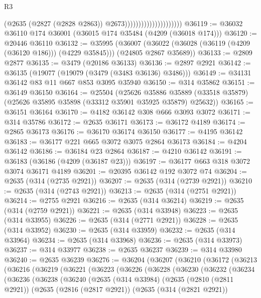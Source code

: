 \begin{lexlean}{R3}
\begin{coremodule}
                                            (@2635 (@2827 (@2828 @2863)) @2673)))))))))))))))))))))
@36119 := @36032 @36110 @174 @36001 (@36015 @174 @35484 (@4209 (@36018 @174)))
@36120 := @20446 @36110
@36132 := @35995
    (@36007 (@36022 (@36028 (@36119 (@4209 (@36120 @186))) (@4229 @35845))) (@24805 @2867 @35689))
@36133 := @2809 @2877
@36135 := @3479 (@20186 @36133)
@36136 := @2897 @2921
@36142 := @36135 (@19077 (@19079 (@3479 (@3483 @36136) @3486)))
@36149 := @34131 @36142 @83 @11 @667 @853 @3095 @35940
@36150 := @314 @35862
@36151 := @36149 @36150
@36164 := @25504
    (@25626
      @35886
      @35889
      (@33518 @35879)
      (@25626 @35895 @35898 (@33312 @35901 @35925 @35879) @25632))
@36165 := @36151 @36164
@36170 := @4182 @36142 @308 @666 @3093 @3072
@36171 := @314 @35786
@36172 := @2635 @36171
@36173 := @36172 @4189
@36174 := @2865 @36173
@36176 := @36170 @36174 @36150
@36177 := @4195 @36142
@36183 := @36177 @221 @665 @3072 @3075 @2864 @36173
@36184 := @4204 @36142
@36186 := @36184 @23 @2864
@36187 := @4210 @36142
@36191 := @36183 (@36186 (@4209 (@36187 @23)))
@36197 := @36177 @663 @318 @3072 @3074 @36171 @4189
@36201 := @20395 @36142 @192 @3072 @74
@36204 := @2635 (@314 (@2735 @2921))
@36207 := @2635 (@314 (@2739 @2921))
@36210 := @2635 (@314 (@2743 @2921))
@36213 := @2635 (@314 (@2751 @2921))
@36214 := @2755 @2921
@36216 := @2635 (@314 @36214)
@36219 := @2635 (@314 (@2759 @2921))
@36221 := @2635 (@314 @33948)
@36223 := @2635 (@314 @33955)
@36226 := @2635 (@314 (@2771 @2921))
@36228 := @2635 (@314 @33952)
@36230 := @2635 (@314 @33959)
@36232 := @2635 (@314 @33964)
@36234 := @2635 (@314 @33968)
@36236 := @2635 (@314 @33973)
@36237 := @314 @33977
@36238 := @2635 @36237
@36239 := @314 @33980
@36240 := @2635 @36239
@36276 := @36204
    (@36207
      (@36210
        (@36172
          (@36213
            (@36216
              (@36219
                (@36221
                  (@36223
                    (@36226
                      (@36228
                        (@36230
                          (@36232
                            (@36234
                              (@36236
                                (@36238
                                  (@36240
                                    (@2635
                                      (@314 @33984)
                                      (@2635
                                        (@2810 (@2811 @2921))
                                        (@2635
                                          (@2816 (@2817 @2921))
                                          (@2635
                                            (@314 (@2821 @2921))

\end{coremodule}
\end{lexlean}
